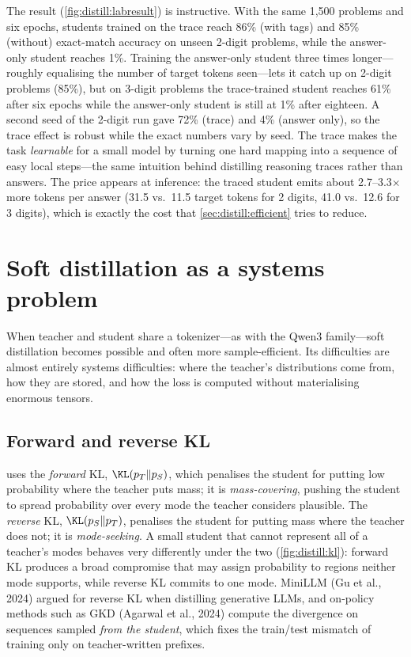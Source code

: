 The result (\cref{fig:distill:labresult}) is instructive. With the same 1{,}500 problems and six
epochs, students trained on the trace reach 86\% (with tags) and 85\% (without) exact-match
accuracy on unseen 2-digit problems, while the answer-only student reaches 1\%. Training the
answer-only student three times longer---roughly equalising the number of target tokens seen---lets
it catch up on 2-digit problems (85\%), but on 3-digit problems the trace-trained student reaches
61\% after six epochs while the answer-only student is still at 1\% after eighteen. A second seed
of the 2-digit run gave 72\% (trace) and 4\% (answer only), so the trace effect is robust while the
exact numbers vary by seed. The trace makes the task \emph{learnable} for a small model by turning
one hard mapping into a sequence of easy local steps---the same intuition behind distilling
reasoning traces rather than answers. The price appears at inference: the traced student emits
about 2.7--3.3$\times$ more tokens per answer (31.5 vs.\ 11.5 target tokens for 2 digits, 41.0 vs.\
12.6 for 3 digits), which is exactly the cost that \cref{sec:distill:efficient} tries to reduce.
\section{Soft distillation as a systems problem}\label{sec:distill:soft}

When teacher and student share a tokenizer---as with the Qwen3 family---soft distillation
becomes possible and often more sample-efficient. Its difficulties are almost entirely systems
difficulties: where the teacher's distributions come from, how they are stored, and how the
loss is computed without materialising enormous tensors.

\subsection{Forward and reverse KL}

 uses the \emph{forward} KL, $\KL(p_T\|p_S)$, which penalises the student
for putting low probability where the teacher puts mass; it is \emph{mass-covering}, pushing the
student to spread probability over every mode the teacher considers plausible. The
\emph{reverse} KL, $\KL(p_S\|p_T)$, penalises the student for putting mass where the teacher
does not; it is \emph{mode-seeking}. A small student that cannot represent all of a teacher's
modes behaves very differently under the two (\cref{fig:distill:kl}): forward KL produces a broad
compromise that may assign probability to regions neither mode supports, while reverse KL
commits to one mode. MiniLLM (Gu et al., 2024) argued for reverse KL when distilling generative
LLMs, and on-policy methods such as GKD (Agarwal et al., 2024) compute the divergence on
sequences sampled \emph{from the student}, which fixes the train/test mismatch of training only
on teacher-written prefixes.

